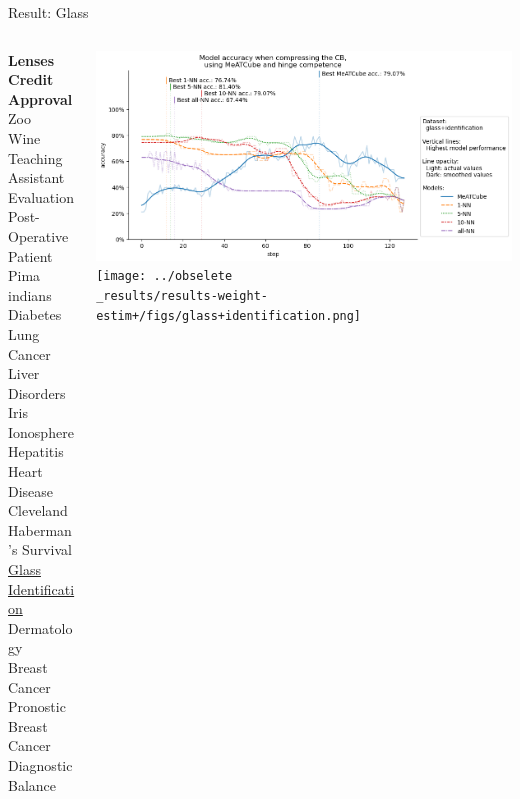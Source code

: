 \documentclass[]{beamer}
\begin{document}
\begin{frame}{Result: Glass}
    \begin{columns}
        \begin{column}{.3\textwidth}
            {\smaller\smaller\smaller
            \textbf{Lenses} \\
            \textbf{Credit Approval} \\
            Zoo \\
            Wine \\
            Teaching Assistant Evaluation \\
            Post-Operative Patient \\
            Pima indians Diabetes \\
            Lung Cancer \\
            Liver Disorders \\
            Iris \\
            Ionosphere \\
            Hepatitis \\
            Heart Disease Cleveland \\
            Haberman's Survival \\
            \underline{Glass Identification} \\
            Dermatology \\
            Breast Cancer Pronostic \\
            Breast Cancer Diagnostic \\
            Balance\\
            ~}
        \end{column}
        \begin{column}{.7\textwidth}
            \includegraphics[width=\textwidth]{../results-no-sim-tuning+/figs/glass+identification.png}
            \texttt{[image: ../obselete\\\_results/results-weight-estim+/figs/glass+identification.png]}
        \end{column}
    \end{columns}
\end{frame}
\end{document}
